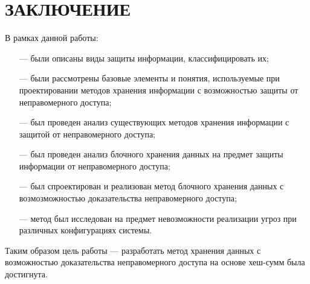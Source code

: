 \section*{ЗАКЛЮЧЕНИЕ}

В рамках данной работы:
\begin{itemize}
	\item [---] были описаны виды защиты информации, классифицировать их;
	\item [---] были рассмотрены базовые элементы и понятия, используемые при проектировании методов хранения информации с возможностью защиты от неправомерного доступа;
	\item [---] был проведен анализ существующих методов хранения информации с защитой от неправомерного доступа;
	\item [---] был проведен анализ блочного хранения данных на предмет защиты информации от неправомерного доступа;
	\item [---] был спроектирован и реализован метод блочного хранения данных с возмозможностью доказательства неправомерного доступа;
	\item [---] метод был исследован на предмет невозможности реализации угроз при различных конфигурациях системы.
\end{itemize}

Таким образом цель работы --- разработать метод хранения данных с возможностью доказательства неправомерного доступа на основе хеш-сумм была достигнута.

\pagebreak